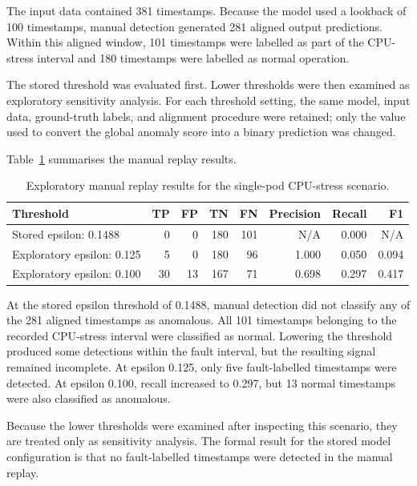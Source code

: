 The input data contained 381 timestamps. Because the model used a lookback of 100 timestamps, manual detection generated 281 aligned output predictions. Within this aligned window, 101 timestamps were labelled as part of the CPU-stress interval and 180 timestamps were labelled as normal operation.

The stored threshold was evaluated first. Lower thresholds were then examined as exploratory sensitivity analysis. For each threshold setting, the same model, input data, ground-truth labels, and alignment procedure were retained; only the value used to convert the global anomaly score into a binary prediction was changed.

Table~\ref{tab:paymentservice-cpu-manual} summarises the manual replay results.

\begin{table}[htbp]
    \centering
    \small
    \caption{Exploratory manual replay results for the single-pod CPU-stress scenario.}
    \label{tab:paymentservice-cpu-manual}
    \begin{tabular}{l r r r r r r r}
        \toprule
        \textbf{Threshold} & \textbf{TP} & \textbf{FP} & \textbf{TN} & \textbf{FN} & \textbf{Precision} & \textbf{Recall} & \textbf{F1} \\
        \midrule
        Stored epsilon: 0.1488
        & 0 & 0 & 180 & 101 & N/A & 0.000 & N/A \\
        Exploratory epsilon: 0.125
        & 5 & 0 & 180 & 96 & 1.000 & 0.050 & 0.094 \\
        Exploratory epsilon: 0.100
        & 30 & 13 & 167 & 71 & 0.698 & 0.297 & 0.417 \\
        \bottomrule
    \end{tabular}
\end{table}

At the stored epsilon threshold of 0.1488, manual detection did not classify any of the 281 aligned timestamps as anomalous. All 101 timestamps belonging to the recorded CPU-stress interval were classified as normal. Lowering the threshold produced some detections within the fault interval, but the resulting signal remained incomplete. At epsilon 0.125, only five fault-labelled timestamps were detected. At epsilon 0.100, recall increased to 0.297, but 13 normal timestamps were also classified as anomalous.

Because the lower thresholds were examined after inspecting this scenario, they are treated only as sensitivity analysis. The formal result for the stored model configuration is that no fault-labelled timestamps were detected in the manual replay.

